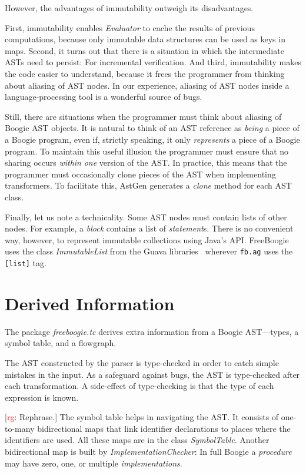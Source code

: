 \documentclass{llncs}
\newcommand{\rg}[1]{{\small [\textcolor{red}{rg}: #1]}}
\begin{document}
However, the advantages of immutability outweigh its
disadvantages.

First, immutability enables \textit{Evaluator} to cache the results of
previous computations, because only immutable data structures can be used
as keys in maps. Second, it turns out that there is a situation in which
the intermediate ASTs need to persist: For incremental verification.  And
third, immutability makes the code easier to understand, because it frees
the programmer from thinking about aliasing of AST nodes. In our
experience, aliasing of AST nodes inside a language-processing tool is a
wonderful source of bugs.

Still, there are situations when the programmer must think about aliasing
of Boogie AST objects. It is natural to think of an AST reference as
\emph{being} a piece of a Boogie program, even if, strictly speaking, it
only \emph{represents} a piece of a Boogie program. To maintain this useful
illusion the programmer must ensure that no sharing occurs \emph{within}
\emph{one} version of the AST\null. In practice, this means that the
programmer must occasionally clone pieces of the AST when implementing
transformers. To facilitate this, AstGen generates a \textit{clone} method
for each AST class.

Finally, let us note a technicality. Some AST nodes must contain lists of
other nodes. For example, a \textit{block} contains a list of
\textit{statement}s. There is no convenient way, however, to represent
immutable collections using Java's API. FreeBoogie uses the class
\textit{ImmutableList} from the Guava libraries~\cite{guava-libraries}
wherever \texttt{fb.ag} uses the \texttt{[list]} tag.

\section{Derived Information} %

The package \textit{freeboogie.tc} derives extra information from
a Boogie AST---types, a symbol table, and a flowgraph.

The AST constructed by the parser is type-checked in order to
catch simple mistakes in the input. As a safeguard against bugs,
the AST is type-checked after each transformation. A side-effect
of type-checking is that the type of each expression is known.

\rg{Rephrase.}
The symbol table helps in navigating the AST\null. It consists of
one-to-many bidirectional maps that link identifier declarations
to places where the identifiers are used. All
these maps are in the class \textit{SymbolTable}.
Another bidirectional map is built by
\textit{ImplementationChecker}: In full Boogie a \emph{procedure}
may have zero, one, or multiple \emph{implementations}. 
\end{document}
